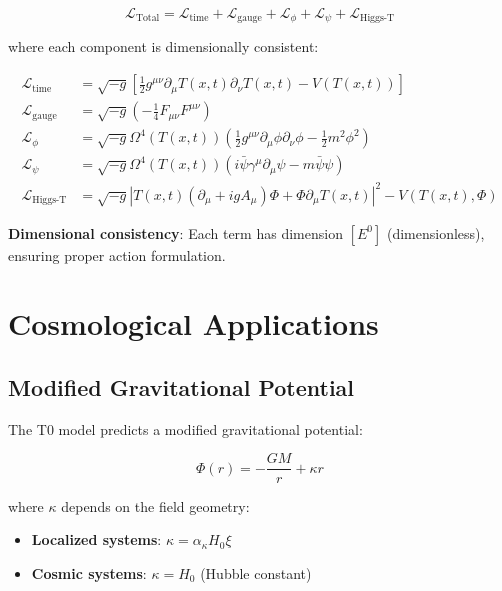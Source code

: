 \documentclass[12pt,a4paper]{article}
\newcommand{\Tfield}{T(x,t)}
\newcommand{\DhiggsT}{\Tfield (\partial_\mu + ig A_\mu) \Phi + \Phi \partial_\mu \Tfield}
\theoremstyle{definition}
\theoremstyle{remark}
\begin{document}
	\begin{equation}
		\mathcal{L}_{\text{Total}} = \mathcal{L}_{\text{time}} + \mathcal{L}_{\text{gauge}} + \mathcal{L}_{\phi} + \mathcal{L}_{\psi} + \mathcal{L}_{\text{Higgs-T}}
		\label{eq:total_lagrangian}
	\end{equation}
	
	where each component is dimensionally consistent:
	
	\begin{align}
		\mathcal{L}_{\text{time}} &= \sqrt{-g} \left[\frac{1}{2} g^{\mu\nu} \partial_\mu \Tfield \partial_\nu \Tfield - V(\Tfield)\right] \\
		\mathcal{L}_{\text{gauge}} &= \sqrt{-g} \left(-\frac{1}{4} F_{\mu\nu} F^{\mu\nu}\right) \\
		\mathcal{L}_{\phi} &= \sqrt{-g} \Omega^4(\Tfield) \left(\frac{1}{2} g^{\mu\nu} \partial_\mu \phi \partial_\nu \phi - \frac{1}{2} m^2 \phi^2\right) \\
		\mathcal{L}_{\psi} &= \sqrt{-g} \Omega^4(\Tfield) \left(i\bar{\psi}\gamma^\mu\partial_\mu\psi - m\bar{\psi}\psi\right) \\
		\mathcal{L}_{\text{Higgs-T}} &= \sqrt{-g} |\DhiggsT|^2 - V(\Tfield, \Phi)
	\end{align}
	
	\textbf{Dimensional consistency}: Each term has dimension $[E^0]$ (dimensionless), ensuring proper action formulation.
	
	\section{Cosmological Applications}
	\label{sec:cosmological_applications}
	
	\subsection{Modified Gravitational Potential}
	\label{subsec:modified_potential}
	
	The T0 model predicts a modified gravitational potential:
	
	\begin{equation}
		\Phi(r) = -\frac{GM}{r} + \kappa r
		\label{eq:modified_gravitational_potential}
	\end{equation}
	
	where $\kappa$ depends on the field geometry:
	\begin{itemize}
		\item \textbf{Localized systems}: $\kappa = \alpha_\kappa H_0 \xi$
		\item \textbf{Cosmic systems}: $\kappa = H_0$ (Hubble constant)
	\end{itemize}
	
\end{document}
